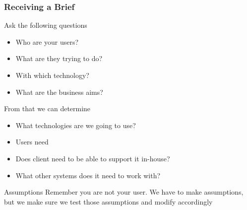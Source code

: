 \subsubsection{Receiving a Brief}

Ask the following questions

\begin{itemize}
    \item Who are your users?
    \item What are they trying to do?
    \item With which technology?
    \item What are the business aims?
\end{itemize}

From that we can determine

\begin{itemize}
    \item What technologies are we going to use?
    \item Users need
    \item Does client need to be able to support it in-house?
    \item What other systems does it need to work with?
\end{itemize}

\begin{infobox}{Assumptions}
    Remember you are not your user. We have to make assumptions, but we make sure we test those assumptions and modify accordingly
\end{infobox}

